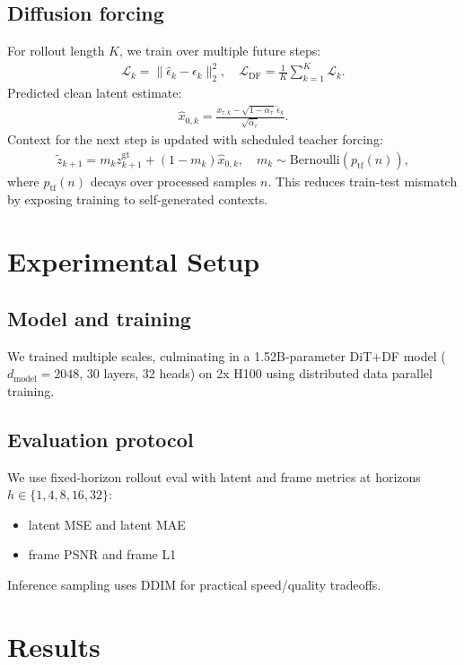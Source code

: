 \documentclass[11pt]{article}
\begin{document}
\subsection{Diffusion forcing}
For rollout length $K$, we train over multiple future steps:
\begin{align}
\mathcal{L}_k = \|\hat{\epsilon}_k-\epsilon_k\|_2^2,\quad
\mathcal{L}_{\text{DF}} = \frac{1}{K}\sum_{k=1}^{K}\mathcal{L}_k.
\end{align}
Predicted clean latent estimate:
\begin{align}
\hat{x}_{0,k} = \frac{x_{\tau,k} - \sqrt{1-\bar{\alpha}_\tau}\,\hat{\epsilon}_k}{\sqrt{\bar{\alpha}_\tau}}.
\end{align}
Context for the next step is updated with scheduled teacher forcing:
\begin{align}
\tilde{z}_{k+1}=m_k z_{k+1}^{\text{gt}}+(1-m_k)\hat{x}_{0,k},\quad
m_k\sim\text{Bernoulli}(p_{\text{tf}}(n)),
\end{align}
where $p_{\text{tf}}(n)$ decays over processed samples $n$. This reduces train-test mismatch by exposing training to self-generated contexts.

\section{Experimental Setup}
\subsection{Model and training}
We trained multiple scales, culminating in a 1.52B-parameter DiT+DF model ($d_{\text{model}}=2048$, 30 layers, 32 heads) on 2x H100 using distributed data parallel training.

\subsection{Evaluation protocol}
We use fixed-horizon rollout eval with latent and frame metrics at horizons
$h\in\{1,4,8,16,32\}$:
\begin{itemize}[leftmargin=*]
  \item latent MSE and latent MAE
  \item frame PSNR and frame L1
\end{itemize}
Inference sampling uses DDIM \cite{song2021ddim} for practical speed/quality tradeoffs.

\section{Results}
\end{document}
